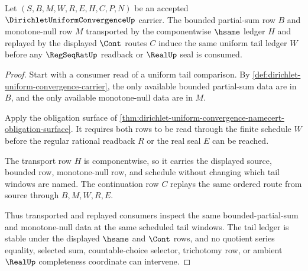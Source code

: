 \begin{theorem}\label{thm:dirichlet-uniform-convergence-tail-stability}
Let $(S,B,M,W,R,E,H,C,P,N)$ be an accepted $\DirichletUniformConvergenceUp$ carrier. The bounded partial-sum row $B$ and monotone-null row $M$ transported by the componentwise $\hsame$ ledger $H$ and replayed by the displayed $\Cont$ routes $C$ induce the same uniform tail ledger $W$ before any $\RegSeqRatUp$ readback or $\RealUp$ seal is consumed.
\end{theorem}
\begin{proof}
Start with a consumer read of a uniform tail comparison. By \autoref{def:dirichlet-uniform-convergence-carrier}, the only available bounded partial-sum data are in $B$, and the only available monotone-null data are in $M$.

Apply the obligation surface of \autoref{thm:dirichlet-uniform-convergence-namecert-obligation-surface}. It requires both rows to be read through the finite schedule $W$ before the regular rational readback $R$ or the real seal $E$ can be reached.

The transport row $H$ is componentwise, so it carries the displayed source, bounded row, monotone-null row, and schedule without changing which tail windows are named. The continuation row $C$ replays the same ordered route from source through $B,M,W,R,E$.

Thus transported and replayed consumers inspect the same bounded-partial-sum and monotone-null data at the same scheduled tail windows. The tail ledger is stable under the displayed $\hsame$ and $\Cont$ rows, and no quotient series equality, selected sum, countable-choice selector, trichotomy row, or ambient $\RealUp$ completeness coordinate can intervene.
\end{proof}




